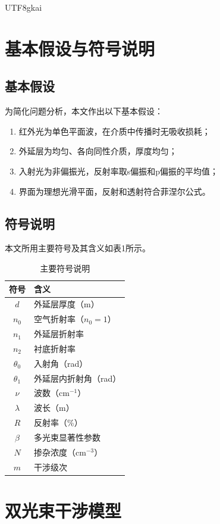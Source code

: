 \documentclass[12pt,a4paper]{article}
\begin{document}
\begin{CJK}{UTF8}{gkai}
\section{基本假设与符号说明}

\subsection{基本假设}

为简化问题分析，本文作出以下基本假设：

\begin{enumerate}[label=(\arabic*)]
\item 红外光为单色平面波，在介质中传播时无吸收损耗；
\item 外延层为均匀、各向同性介质，厚度均匀；
\item 入射光为非偏振光，反射率取s偏振和p偏振的平均值；
\item 界面为理想光滑平面，反射和透射符合菲涅尔公式。
\end{enumerate}

\subsection{符号说明}

本文所用主要符号及其含义如表1所示。

\begin{table}[H]
\centering
\caption{主要符号说明}
\begin{tabular}{cl}
\toprule
符号 & 含义 \\
\midrule
$d$ & 外延层厚度（m） \\
$n_0$ & 空气折射率（$n_0=1$） \\
$n_1$ & 外延层折射率 \\
$n_2$ & 衬底折射率 \\
$\theta_0$ & 入射角（rad） \\
$\theta_1$ & 外延层内折射角（rad） \\
$\nu$ & 波数（cm$^{-1}$） \\
$\lambda$ & 波长（m） \\
$R$ & 反射率（\%） \\
$\beta$ & 多光束显著性参数 \\
$N$ & 掺杂浓度（cm$^{-3}$） \\
$m$ & 干涉级次 \\
\bottomrule
\end{tabular}
\end{table}

\section{双光束干涉模型}


\end{CJK}
\end{document}

